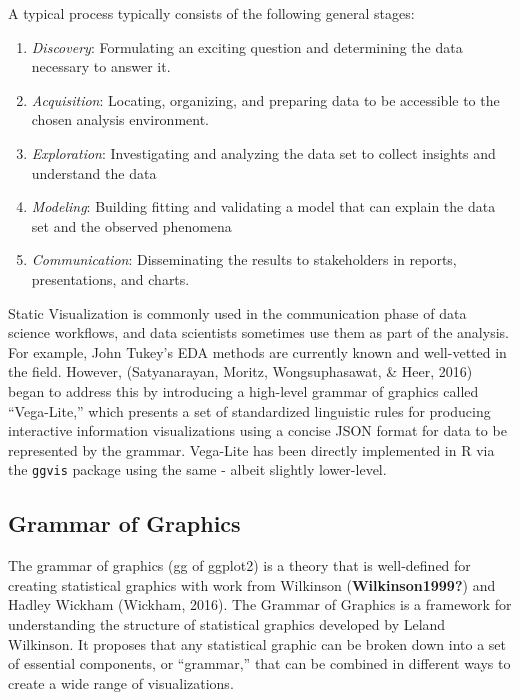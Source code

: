 \documentclass[print]{nuthesis}
\providecommand{\tightlist}{%
  \setlength{\itemsep}{0pt}\setlength{\parskip}{0pt}}
\begin{document}
A typical process typically consists of the following general stages:

\begin{enumerate}
\def\labelenumi{\arabic{enumi}.}
\tightlist
\item
  \emph{Discovery}: Formulating an exciting question and determining the data necessary to answer it.
\item
  \emph{Acquisition}: Locating, organizing, and preparing data to be accessible to the chosen analysis environment.
\item
  \emph{Exploration}: Investigating and analyzing the data set to collect insights and understand the data
\item
  \emph{Modeling}: Building fitting and validating a model that can explain the data set and the observed phenomena
\item
  \emph{Communication}: Disseminating the results to stakeholders in reports, presentations, and charts.
\end{enumerate}

Static Visualization is commonly used in the communication phase of data science workflows, and data scientists sometimes use them as part of the analysis. For example, John Tukey's EDA methods are currently known and well-vetted in the field. However, (Satyanarayan, Moritz, Wongsuphasawat, \& Heer, 2016) began to address this by introducing a high-level grammar of graphics called ``Vega-Lite,'' which presents a set of standardized linguistic rules for producing interactive information visualizations using a concise JSON format for data to be represented by the grammar. Vega-Lite has been directly implemented in R via the \texttt{ggvis} package using the same - albeit slightly lower-level.

\hypertarget{grammar-of-graphics}{%
\subsection{Grammar of Graphics}\label{grammar-of-graphics}}

The grammar of graphics (gg of ggplot2) is a theory that is well-defined for creating statistical graphics with work from Wilkinson (\textbf{Wilkinson1999?}) and Hadley Wickham (Wickham, 2016). The Grammar of Graphics is a framework for understanding the structure of statistical graphics developed by Leland Wilkinson. It proposes that any statistical graphic can be broken down into a set of essential components, or ``grammar,'' that can be combined in different ways to create a wide range of visualizations.
\end{document}
